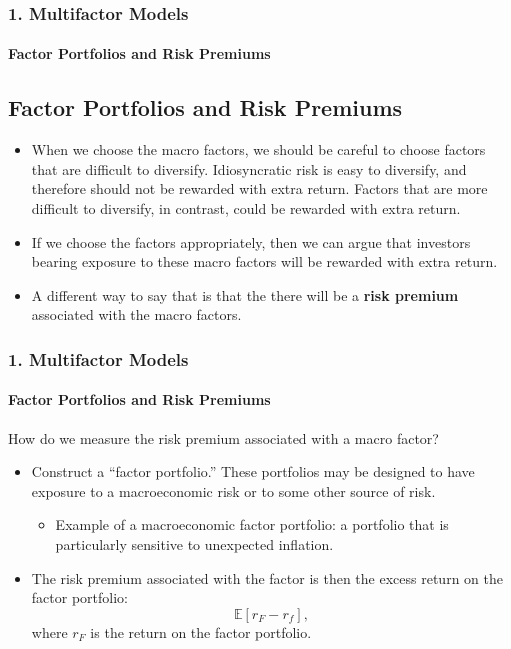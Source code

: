 \documentclass{beamer}
\begin{document}
\begin{frame}[t]
    \frametitle{1. Multifactor Models}
    \framesubtitle{Factor Portfolios and Risk Premiums}
    \subsection{Factor Portfolios and Risk Premiums}

    \begin{itemize}
    \item When we choose the macro factors, we should be careful to choose factors that are difficult to diversify. Idiosyncratic risk is easy to diversify, and therefore should not be rewarded with extra return. Factors that are more difficult to diversify, in contrast, could be rewarded with extra return.
    \item If we choose the factors appropriately, then we can argue that investors bearing exposure to these macro factors will be rewarded with extra return.   
    \item A different way to say that is that the there will be a \textbf{risk premium }associated with the macro factors.

    \end{itemize}
 
\end{frame}

\begin{frame}[t]
    \frametitle{1. Multifactor Models}
    \framesubtitle{Factor Portfolios and Risk Premiums}

    How do we measure the risk premium associated with a macro factor?
    \begin{itemize}
    \item Construct a ``factor portfolio.'' These portfolios may be designed to have exposure to a macroeconomic risk or to some other source of risk.
    \begin{itemize}
        \item Example of a macroeconomic factor portfolio: a portfolio that is particularly sensitive to unexpected inflation.
    \end{itemize}
    \item The risk premium associated with the factor is then the excess return on the factor portfolio:
    \[
        \mathbb{E}[r_F-r_f],
    \]
    where $r_F$ is the return on the factor portfolio.
    \end{itemize}   


\end{frame}
\end{document}
